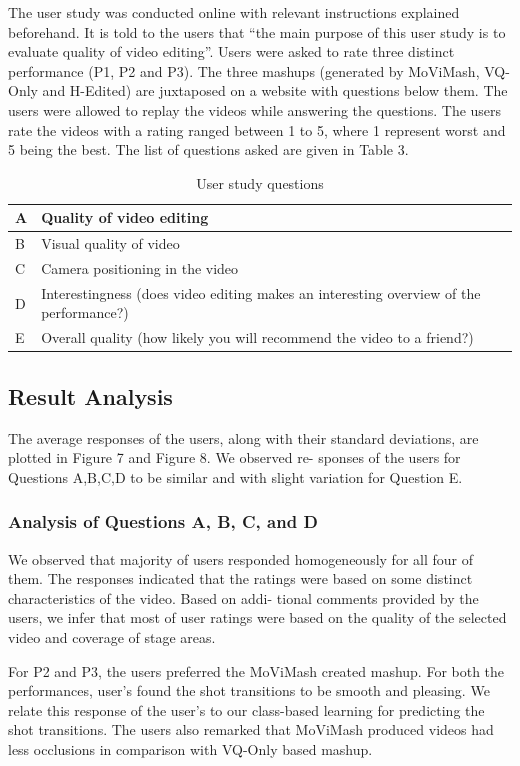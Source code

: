 \documentclass[conference]{IEEEtran}
\begin{document}
The user study was conducted online with relevant instructions
explained beforehand. It is told to the users that “the main purpose
of this user study is to evaluate quality of video editing”. Users
were asked to rate three distinct performance (P1, P2 and P3). The
three mashups (generated by MoViMash, VQ-Only and H-Edited)
are juxtaposed on a website with questions below them. The users were allowed to replay the videos while answering the questions.
The users rate the videos with a rating ranged between 1 to 5, where
1 represent worst and 5 being the best. The list of questions asked
are given in Table 3.
\begin{table}
\centering
\small
\caption{User study questions}
\begin{tabular}{p{1cm}|p{7cm}}
A&Quality of video editing\\ \hline
B&Visual quality of video\\ \hline
C&Camera positioning in the video\\ \hline
D&Interestingness (does video editing makes an interesting
overview of the performance?)\\ \hline
E&Overall quality (how likely you will recommend the video to
a friend?)\\\hline
\end{tabular}
\end{table}

 \subsection{Result Analysis}
The average responses of the users, along with their standard
deviations, are plotted in Figure 7 and Figure 8. We observed re-
sponses of the users for Questions A,B,C,D to be similar and with
slight variation for Question E.

\subsubsection{Analysis of Questions A, B, C, and D}
We observed that majority of users responded homogeneously
for all four of them. The responses indicated that the ratings were
based on some distinct characteristics of the video. Based on addi-
tional comments provided by the users, we infer that most of user
ratings were based on the quality of the selected video and coverage
of stage areas.

For P2 and P3, the users preferred the MoViMash created mashup.
For both the performances, user’s found the shot transitions to be
smooth and pleasing. We relate this response of the user’s to our
class-based learning for predicting the shot transitions. The users
also remarked that MoViMash produced videos had less occlusions
in comparison with VQ-Only based mashup.
\end{document}
